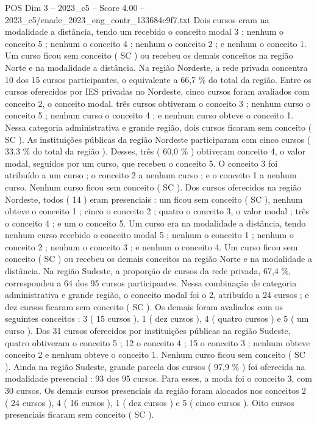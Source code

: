 \begin{textsample}{POS Dim 3 – 2023\_c5 – Score 4.00 – 2023\_c5/enade\_2023\_eng\_contr\_133684c9f7.txt}
Dois cursos eram na modalidade a distância, tendo um recebido o conceito modal 3 ; nenhum o conceito 5 ; nenhum o conceito 4 ; nenhum o conceito 2 ; e nenhum o conceito 1.
Um curso ficou sem conceito ( SC ) ou recebeu os demais conceitos na região Norte e na modalidade a distância.
Na região Nordeste, a rede privada concentra 10 dos 15 cursos participantes, o equivalente a 66,7 \% do total da região.
Entre os cursos oferecidos por IES privadas no Nordeste, cinco cursos foram avaliados com conceito 2, o conceito modal. três cursos obtiveram o conceito 3 ; nenhum curso o conceito 5 ; nenhum curso o conceito 4 ; e nenhum curso obteve o conceito 1.
Nessa categoria administrativa e grande região, dois cursos ficaram sem conceito ( SC ).
As instituições públicas da região Nordeste participaram com cinco cursos ( 33,3 \% do total da região ).
Desses, três ( 60,0 \% ) obtiveram conceito 4, o valor modal, seguidos por um curso, que recebeu o conceito 5.
O conceito 3 foi atribuído a um curso ; o conceito 2 a nenhum curso ; e o conceito 1 a nenhum curso.
Nenhum curso ficou sem conceito ( SC ).
Dos cursos oferecidos na região Nordeste, todos ( 14 ) eram presenciais : um ficou sem conceito ( SC ), nenhum obteve o conceito 1 ; cinco o conceito 2 ; quatro o conceito 3, o valor modal ; três o conceito 4 ; e um o conceito 5.
Um curso era na modalidade a distância, tendo nenhum curso recebido o conceito modal 5 ; nenhum o conceito 1 ; nenhum o conceito 2 ; nenhum o conceito 3 ; e nenhum o conceito 4.
Um curso ficou sem conceito ( SC ) ou recebeu os demais conceitos na região Norte e na modalidade a distância.
Na região Sudeste, a proporção de cursos da rede privada, 67,4 \%, correspondeu a 64 dos 95 cursos participantes.
Nessa combinação de categoria administrativa e grande região, o conceito modal foi o 2, atribuído a 24 cursos ; e dez cursos ficaram sem conceito ( SC ).
Os demais foram avaliados com os seguintes conceitos : 3 ( 15 cursos ), 1 ( dez cursos ), 4 ( quatro cursos ) e 5 ( um curso ).
Dos 31 cursos oferecidos por instituições públicas na região Sudeste, quatro obtiveram o conceito 5 ; 12 o conceito 4 ; 15 o conceito 3 ; nenhum obteve conceito 2 e nenhum obteve o conceito 1.
Nenhum curso ficou sem conceito ( SC ).
Ainda na região Sudeste, grande parcela dos cursos ( 97,9 \% ) foi oferecida na modalidade presencial : 93 dos 95 cursos.
Para esses, a moda foi o conceito 3, com 30 cursos.
Os demais cursos presenciais da região foram alocados nos conceitos 2 ( 24 cursos ), 4 ( 16 cursos ), 1 ( dez cursos ) e 5 ( cinco cursos ).
Oito cursos presenciais ficaram sem conceito ( SC ).

\end{textsample}
